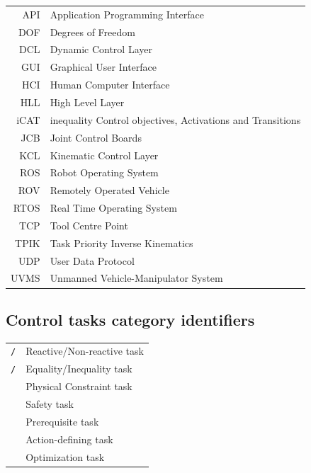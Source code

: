 \label{nomenclature}
\begin{tabular}{rl}
	API & Application Programming Interface \\
	DOF & Degrees of Freedom \\
	DCL & Dynamic Control Layer \\
	GUI & Graphical User Interface \\
	HCI & Human Computer Interface \\
	HLL & High Level Layer \\
	iCAT & inequality Control objectives, Activations and Transitions \\
	JCB & Joint Control Boards \\
	KCL & Kinematic Control Layer \\
	ROS & Robot Operating System \\	
	ROV & Remotely Operated Vehicle \\
	RTOS & Real Time Operating System \\
	TCP & Tool Centre Point \\
	TPIK & Task Priority Inverse Kinematics \\
	UDP & User Data Protocol \\
	UVMS & Unmanned Vehicle-Manipulator System \\
	
\end{tabular}

\subsection*{Control tasks category identifiers}
\begin{tabular}{rl}
	\texttt{\reactTask/\nonReactTask} & Reactive/Non-reactive task \\
	\texttt{\eqTask/\ineqTask} & Equality/Inequality task \\
	\constrTask   & Physical Constraint task \\
	\safetyTask   & Safety task\\
	\prereqTask   & Prerequisite task\\
	\actdefTask   & Action-defining task\\
	\optimTask    & Optimization task\\
\end{tabular}	
